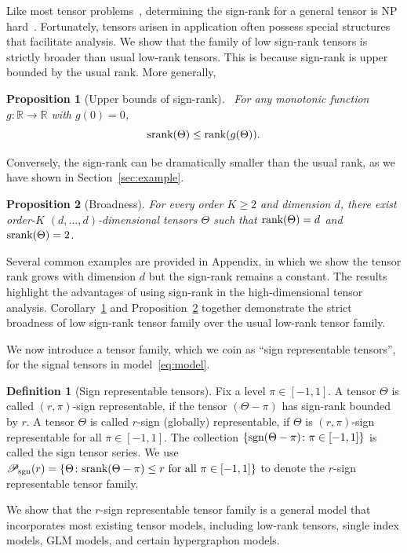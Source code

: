 \documentclass{article}
\theoremstyle{plain}
\newtheorem{prop}{Proposition}
\theoremstyle{definition}
\newtheorem{defn}{Definition}
\def\sign{\textup{sgn}}
\def\srank{\textup{srank}}
\def\rank{\textup{rank}}
\def\caliP{\mathscr{P}_{\textup{sgn}}}
\begin{document}
Like most tensor problems~\cite{hillar2013most}, determining the sign-rank for a general tensor is NP hard~\cite{alon2016sign}. Fortunately, tensors arisen in application often possess special structures that facilitate analysis. We show that the family of low sign-rank tensors is strictly broader than usual low-rank tensors. This is because sign-rank is upper bounded by the usual rank. More generally, 
\begin{prop}[Upper bounds of sign-rank]~\label{cor:monotonic} For any monotonic function $g\colon \mathbb{R}\to \mathbb{R}$ with $g(0)=0$, 
\[
\textup{srank}(\Theta)\leq\rank(g(\Theta)).
\]
\end{prop}
Conversely, the sign-rank can be dramatically smaller than the usual rank, as we have shown in Section~\ref{sec:example}.
\begin{prop}[Broadness]\label{prop:extention}For every order $K\geq 2$ and dimension $d$, there exist order-$K$ $(d,\ldots,d)$-dimensional tensors $\Theta$ such that $\rank(\Theta)=d$ and $\srank(\Theta)=2$.
\end{prop}
Several common examples are provided in Appendix, in which we show the tensor rank grows with dimension $d$ but the sign-rank remains a constant. The results highlight the advantages of using sign-rank in the high-dimensional tensor analysis. Corollary~\ref{cor:monotonic} and Proposition~\ref{prop:extention} together demonstrate the strict broadness of low sign-rank tensor family over the usual low-rank tensor family. 

We now introduce a tensor family, which we coin as ``sign representable tensors'', for the signal tensors in model~\eqref{eq:model}. 
\begin{defn}[Sign representable tensors] 
Fix a level $\pi\in[-1,1]$. A tensor $\Theta$ is called $(r,\pi)$-sign representable, if the tensor $(\Theta-\pi)$ has sign-rank bounded by $r$. A tensor $\Theta$ is called $r$-sign (globally) representable, if $\Theta$ is $(r,\pi)$-sign representable for all $\pi\in[-1,1]$. The collection $\{\sign(\Theta-\pi)\colon \pi \in[-1,1]\}$ is called the sign tensor series. 
We use $\caliP(r)=\{\Theta\colon \srank(\Theta-\pi)\leq r \text{ for all }\pi\in[-1,1]\}$ to denote the $r$-sign representable tensor family.
\end{defn}
We show that the $r$-sign representable tensor family is a general model that incorporates most existing tensor models, including low-rank tensors, single index models, GLM models, and certain hypergraphon models. 
\end{document}
